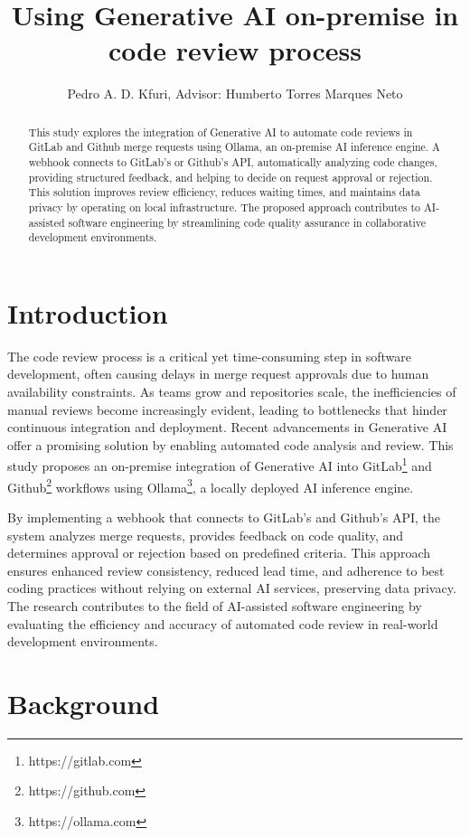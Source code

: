 \documentclass[12pt]{article}
\title{Using Generative AI on-premise in code review process}
\author{Pedro A. D. Kfuri\inst{1}, Advisor: Humberto Torres Marques Neto\inst{1} }
\begin{document}
 
\maketitle
\begin{abstract}
This study explores the integration of Generative AI to automate code reviews in GitLab and Github merge requests using Ollama, an on-premise AI inference engine. A webhook connects to GitLab's or Github's API, automatically analyzing code changes, providing structured feedback, and helping to decide on request approval or rejection. This solution improves review efficiency, reduces waiting times, and maintains data privacy by operating on local infrastructure. The proposed approach contributes to AI-assisted software engineering by streamlining code quality assurance in collaborative development environments.
\end{abstract}

\section{Introduction}
The code review process is a critical yet time-consuming step in software development, often causing delays in merge request approvals due to human availability constraints. As teams grow and repositories scale, the inefficiencies of manual reviews become increasingly evident, leading to bottlenecks that hinder continuous integration and deployment. Recent advancements in Generative AI offer a promising solution by enabling automated code analysis and review. This study proposes an on-premise integration of Generative AI into GitLab\footnote{https://gitlab.com} and Github\footnote{https://github.com} workflows using Ollama\footnote{https://ollama.com}, a locally deployed AI inference engine.
    
By implementing a webhook that connects to GitLab’s and Github's API, the system analyzes merge requests, provides feedback on code quality, and determines approval or rejection based on predefined criteria. This approach ensures enhanced review consistency, reduced lead time, and adherence to best coding practices without relying on external AI services, preserving data privacy. The research contributes to the field of AI-assisted software engineering by evaluating the efficiency and accuracy of automated code review in real-world development environments.

\section{Background}
\end{document}
